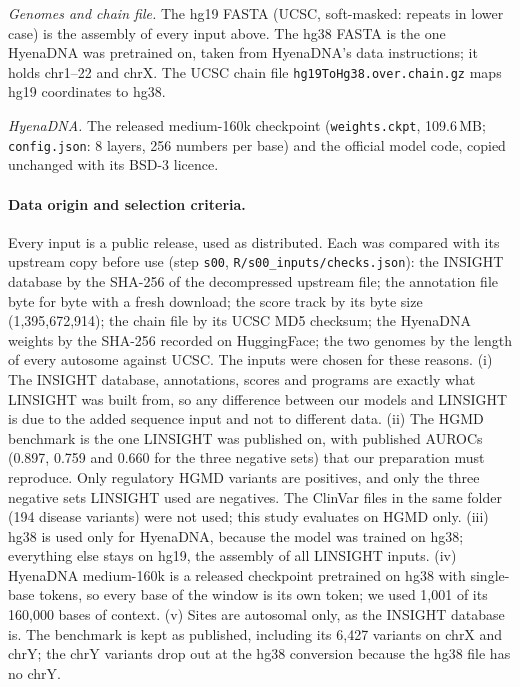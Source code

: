 \documentclass[11pt]{article}
\newcommand{\file}[1]{\nolinkurl{#1}}
\begin{document}
\emph{Genomes and chain file.} The hg19 FASTA (UCSC, soft-masked: repeats in lower case) is the assembly of
every input above. The hg38 FASTA is the one HyenaDNA was pretrained on, taken from HyenaDNA's data
instructions; it holds chr1--22 and chrX. The UCSC chain file \file{hg19ToHg38.over.chain.gz} maps hg19
coordinates to hg38.

\emph{HyenaDNA.} The released medium-160k checkpoint (\file{weights.ckpt}, 109.6\,MB; \file{config.json}: 8
layers, 256 numbers per base) and the official model code, copied unchanged with its BSD-3 licence.

\paragraph{Data origin and selection criteria.} Every input is a public release, used as distributed.
Each was compared with its upstream copy before use (step \file{s00}, \file{R/s00_inputs/checks.json}): the
INSIGHT database by the SHA-256 of the decompressed upstream file; the annotation file byte for byte with a
fresh download; the score track by its byte size (1,395,672,914); the chain file by its UCSC MD5 checksum;
the HyenaDNA weights by the SHA-256 recorded on HuggingFace; the two genomes by the length of every autosome
against UCSC. The inputs were chosen for these reasons. (i) The INSIGHT database, annotations, scores and
programs are exactly what LINSIGHT was built from, so any difference between our models and LINSIGHT is
due to the added sequence input and not to different data. (ii) The HGMD benchmark is the one LINSIGHT was
published on, with published AUROCs (0.897, 0.759 and 0.660 for the three negative sets) that our
preparation must reproduce. Only regulatory HGMD variants are positives, and only the three negative sets
LINSIGHT used are negatives. The ClinVar files in the same folder (194 disease variants) were not used; this
study evaluates on HGMD only. (iii) hg38 is used only for HyenaDNA, because the model was trained on hg38;
everything else stays on hg19, the assembly of all LINSIGHT inputs. (iv) HyenaDNA medium-160k is a released checkpoint pretrained on hg38 with single-base tokens, so every
base of the window is its own token; we used 1,001 of its 160,000 bases of context. (v) Sites are autosomal only, as the INSIGHT database is. The benchmark is kept as published,
including its 6,427 variants on chrX and chrY; the chrY variants drop out at the hg38 conversion because
the hg38 file has no chrY.

\end{document}
